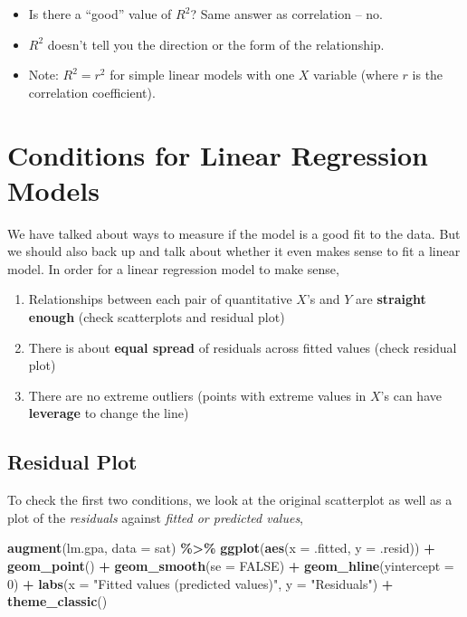 \documentclass[
]{book}
\newenvironment{Shaded}{\begin{snugshade}}{\end{snugshade}}
\newcommand{\AttributeTok}[1]{\textcolor[rgb]{0.13,0.29,0.53}{#1}}
\newcommand{\ConstantTok}[1]{\textcolor[rgb]{0.56,0.35,0.01}{#1}}
\newcommand{\DecValTok}[1]{\textcolor[rgb]{0.00,0.00,0.81}{#1}}
\newcommand{\FunctionTok}[1]{\textcolor[rgb]{0.13,0.29,0.53}{\textbf{#1}}}
\newcommand{\NormalTok}[1]{#1}
\newcommand{\SpecialCharTok}[1]{\textcolor[rgb]{0.81,0.36,0.00}{\textbf{#1}}}
\newcommand{\StringTok}[1]{\textcolor[rgb]{0.31,0.60,0.02}{#1}}
\providecommand{\tightlist}{%
  \setlength{\itemsep}{0pt}\setlength{\parskip}{0pt}}
\begin{document}
\begin{itemize}
\item
  Is there a ``good'' value of \(R^2\)? Same answer as correlation -- no.
\item
  \(R^2\) doesn't tell you the direction or the form of the relationship.
\item
  Note: \(R^2 = r^2\) for simple linear models with one \(X\) variable (where \(r\) is the correlation coefficient).
\end{itemize}

\section{Conditions for Linear Regression Models}\label{conditions-for-linear-regression-models}

We have talked about ways to measure if the model is a good fit to the data. But we should also back up and talk about whether it even makes sense to fit a linear model. In order for a linear regression model to make sense,

\begin{enumerate}
\def\labelenumi{\arabic{enumi}.}
\tightlist
\item
  Relationships between each pair of quantitative \(X\)'s and \(Y\) are \textbf{straight enough} (check scatterplots and residual plot)
\item
  There is about \textbf{equal spread} of residuals across fitted values (check residual plot)
\item
  There are no extreme outliers (points with extreme values in \(X\)'s can have \textbf{leverage} to change the line)
\end{enumerate}

\subsection{Residual Plot}\label{residual-plot}

To check the first two conditions, we look at the original scatterplot as well as a plot of the \emph{residuals} against \emph{fitted or predicted values},

\begin{Shaded}
\begin{Highlighting}[]
\FunctionTok{augment}\NormalTok{(lm.gpa, }\AttributeTok{data =}\NormalTok{ sat) }\SpecialCharTok{\%\textgreater{}\%}
    \FunctionTok{ggplot}\NormalTok{(}\FunctionTok{aes}\NormalTok{(}\AttributeTok{x =}\NormalTok{ .fitted, }\AttributeTok{y =}\NormalTok{ .resid)) }\SpecialCharTok{+}
    \FunctionTok{geom\_point}\NormalTok{() }\SpecialCharTok{+}
    \FunctionTok{geom\_smooth}\NormalTok{(}\AttributeTok{se =} \ConstantTok{FALSE}\NormalTok{) }\SpecialCharTok{+}
    \FunctionTok{geom\_hline}\NormalTok{(}\AttributeTok{yintercept =} \DecValTok{0}\NormalTok{) }\SpecialCharTok{+}
    \FunctionTok{labs}\NormalTok{(}\AttributeTok{x =} \StringTok{"Fitted values (predicted values)"}\NormalTok{, }\AttributeTok{y =} \StringTok{"Residuals"}\NormalTok{) }\SpecialCharTok{+}
    \FunctionTok{theme\_classic}\NormalTok{()}
\end{Highlighting}
\end{Shaded}
\end{document}
